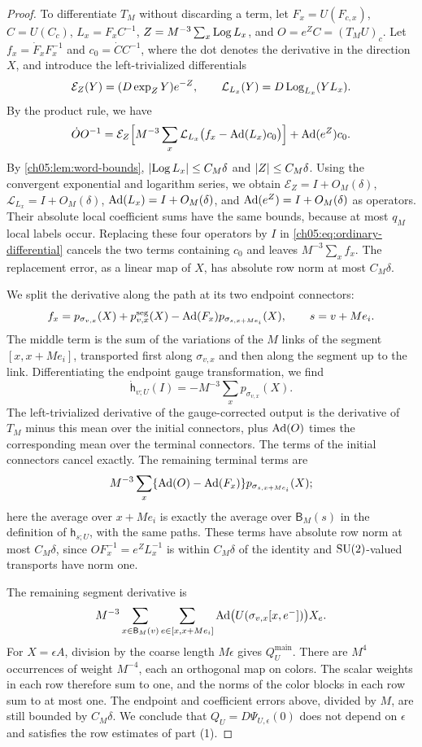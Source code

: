 \begin{proof}
To differentiate $T_M$ without discarding a term, let $F_x=U(F_{c,x})$, $C=U(C_c)$, $L_x=F_xC^{-1}$, $Z=M^{-3}\sum_x\operatorname{Log} L_x$, and $O=e^ZC=(T_MU)_c$. Let $f_x=\dot F_xF_x^{-1}$ and $c_0=\dot CC^{-1}$, where the dot denotes the derivative in the direction $X$, and introduce the left-trivialized differentials
\[
 \mathcal E_Z(Y)=(D\exp_ZY)e^{-Z},\qquad\mathcal L_{L_x}(Y)=D\operatorname{Log}_{L_x}(YL_x).
\]
By the product rule, we have
\begin{equation}\label{ch05:eq:ordinary-differential}
 \dot OO^{-1}=\mathcal E_Z\Bigl[M^{-3}\sum_x\mathcal L_{L_x}\bigl(f_x-\operatorname{Ad}(L_x)c_0\bigr)\Bigr]+\operatorname{Ad}(e^Z)c_0.
\end{equation}
By \cref{ch05:lem:word-bounds}, $\lvert \operatorname{Log} L_x\rvert\le C_M\delta$ and $\lvert Z\rvert\le C_M\delta$. Using the convergent exponential and logarithm series, we obtain $\mathcal E_Z=I+O_M(\delta)$, $\mathcal L_{L_x}=I+O_M(\delta)$, $\operatorname{Ad}(L_x)=I+O_M(\delta)$, and $\operatorname{Ad}(e^Z)=I+O_M(\delta)$ as operators. Their absolute local coefficient sums have the same bounds, because at most $q_M$ local labels occur. Replacing these four operators by $I$ in \eqref{ch05:eq:ordinary-differential} cancels the two terms containing $c_0$ and leaves $M^{-3}\sum_xf_x$. The replacement error, as a linear map of $X$, has absolute row norm at most $C_M\delta$.

We split the derivative along the path at its two endpoint connectors:
\[
 f_x=p_{\sigma_{v,x}}(X)+p^{\mathrm{seg}}_{v,x}(X)-\operatorname{Ad}(F_x)p_{\sigma_{s,x+Me_i}}(X),\qquad s=v+Me_i.
\]
The middle term is the sum of the variations of the $M$ links of the segment $[x,x+Me_i]$, transported first along $\sigma_{v,x}$ and then along the segment up to the link. Differentiating the endpoint gauge transformation, we find
\[
 \dot{\mathsf h}_{v;U}(I)=-M^{-3}\sum_xp_{\sigma_{v,x}}(X).
\]
The left-trivialized derivative of the gauge-corrected output is the derivative of $T_M$ minus this mean over the initial connectors, plus $\operatorname{Ad}(O)$ times the corresponding mean over the terminal connectors. The terms of the initial connectors cancel exactly. The remaining terminal terms are
\[
 M^{-3}\sum_x\{\operatorname{Ad}(O)-\operatorname{Ad}(F_x)\}p_{\sigma_{s,x+Me_i}}(X);
\]
here the average over $x+Me_i$ is exactly the average over $\mathsf B_M(s)$ in the definition of $\mathsf h_{s;U}$, with the same paths. These terms have absolute row norm at most $C_M\delta$, since $OF_x^{-1}=e^ZL_x^{-1}$ is within $C_M\delta$ of the identity and $\mathrm{SU}(2)$-valued transports have norm one.

The remaining segment derivative is
\[
 M^{-3}\sum_{x\in\mathsf B_M(v)}\sum_{e\in[x,x+Me_i]}\operatorname{Ad}\bigl(U(\sigma_{v,x}[x,e^-])\bigr)X_e.
\]
For $X=\epsilon A$, division by the coarse length $M\epsilon$ gives $Q_U^{\mathrm{main}}$. There are $M^4$ occurrences of weight $M^{-4}$, each an orthogonal map on colors. The scalar weights in each row therefore sum to one, and the norms of the color blocks in each row sum to at most one. The endpoint and coefficient errors above, divided by $M$, are still bounded by $C_M\delta$. We conclude that $Q_U=D\Psi_{U,\epsilon}(0)$ does not depend on $\epsilon$ and satisfies the row estimates of part (1).


\end{proof}
